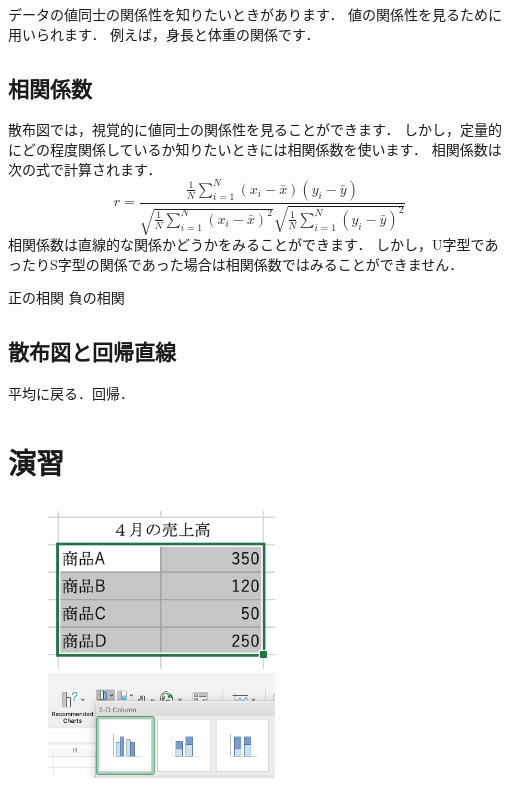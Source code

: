データの値同士の関係性を知りたいときがあります．
値の関係性を見るために用いられます．
例えば，身長と体重の関係です．


\subsection{相関係数}

散布図では，視覚的に値同士の関係性を見ることができます．
しかし，定量的にどの程度関係しているか知りたいときには相関係数を使います．
相関係数は次の式で計算されます．
\begin{equation}
    \label{eq:1}
    r = \frac{\frac{1}{N} \sum_{i=1}^N (x_i - \bar{x})(y_i - \bar{y})}{\sqrt{\frac{1}{N} \sum_{i=1}^N (x_i - \bar{x})^2} \sqrt{\frac{1}{N} \sum_{i=1}^N(y_i - \bar{y})^2}}
\end{equation}
相関係数は直線的な関係かどうかをみることができます．
しかし，U字型であったりS字型の関係であった場合は相関係数ではみることができません．

正の相関
負の相関

\subsection{散布図と回帰直線}

平均に戻る．回帰．


\section{演習}

\subsection{}


\begin{figure}[htbp]
    \begin{minipage}{0.5\hsize}
        \centering
        \includegraphics[width=6cm]{chap2/bar1.png}
        \caption{}
        \label{fig:bar1}
    \end{minipage}
    \begin{minipage}{0.5\hsize}
        \centering
        \includegraphics[width=6cm]{chap2/bar2.png}
        \caption{}
        \label{fig:bar2}
    \end{minipage}
\end{figure}



